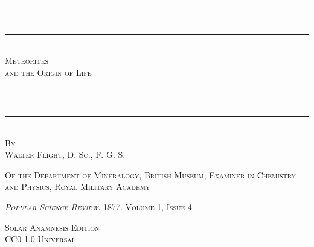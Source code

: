 \documentclass[a4paper, 11pt, oneside, english]{article}
\begin{document}
\begin{titlepage}
    \centering                     %

    \rule{\textwidth}{1.6pt}\\[-\baselineskip]\vskip2pt
    \rule{\textwidth}{0.4pt}\\[1\baselineskip]

    {\scshape\Huge Meteorites\\ and the Origin of Life}\\[1\baselineskip]

    \rule{\textwidth}{0.4pt}\\[-\baselineskip]\vskip3.2pt
    \rule{\textwidth}{1.6pt}\\[1\baselineskip]

    
    {\scshape By \\\Large Walter Flight, \normalsize D. Sc., F. G. S.}


    {\scshape \small Of the Department of Mineralogy, British Museum; Examiner in Chemistry and Physics, Royal Military Academy}



    \vfill

    {\scshape\small }

    {\scshape \emph{Popular Science Review}. 1877. Volume 1, Issue 4}

    {\scshape Solar Anamnesis Edition}\\[0.2\baselineskip]
    {\scshape\small CC0 1.0 Universal}
\end{titlepage}
\setlength{\parskip}{1mm plus1mm minus1mm}
\clearpage
\end{document}
